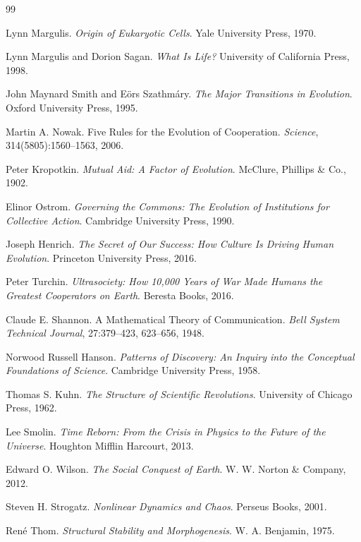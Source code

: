 \documentclass[12pt]{article}
\begin{document}
\begin{thebibliography}{99}

Lynn Margulis.
\textit{Origin of Eukaryotic Cells}.
Yale University Press, 1970.

Lynn Margulis and Dorion Sagan.
\textit{What Is Life?}
University of California Press, 1998.

John Maynard Smith and Eörs Szathmáry.
\textit{The Major Transitions in Evolution}.
Oxford University Press, 1995.

Martin A. Nowak.
Five Rules for the Evolution of Cooperation.
\textit{Science}, 314(5805):1560--1563, 2006.

Peter Kropotkin.
\textit{Mutual Aid: A Factor of Evolution}.
McClure, Phillips \& Co., 1902.

Elinor Ostrom.
\textit{Governing the Commons: The Evolution of Institutions for Collective Action}.
Cambridge University Press, 1990.

Joseph Henrich.
\textit{The Secret of Our Success: How Culture Is Driving Human Evolution}.
Princeton University Press, 2016.

Peter Turchin.
\textit{Ultrasociety: How 10,000 Years of War Made Humans the Greatest Cooperators on Earth}.
Beresta Books, 2016.

Claude E. Shannon.
A Mathematical Theory of Communication.
\textit{Bell System Technical Journal}, 27:379--423, 623--656, 1948.

Norwood Russell Hanson.
\textit{Patterns of Discovery: An Inquiry into the Conceptual Foundations of Science}.
Cambridge University Press, 1958.

Thomas S. Kuhn.
\textit{The Structure of Scientific Revolutions}.
University of Chicago Press, 1962.

Lee Smolin.
\textit{Time Reborn: From the Crisis in Physics to the Future of the Universe}.
Houghton Mifflin Harcourt, 2013.

Edward O. Wilson.
\textit{The Social Conquest of Earth}.
W. W. Norton \& Company, 2012.

Steven H. Strogatz.
\textit{Nonlinear Dynamics and Chaos}.
Perseus Books, 2001.

René Thom.
\textit{Structural Stability and Morphogenesis}.
W. A. Benjamin, 1975.


\end{thebibliography}
\end{document}
